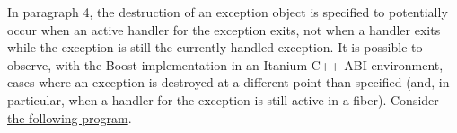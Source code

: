\newpage
{}\label{exlife}

In  paragraph 4, the destruction of an exception
object is specified to potentially occur when an active handler for the
exception exits, not when a handler exits while the exception is still the
currently handled exception. It is possible to observe, with the Boost
implementation in an Itanium C++ ABI environment, cases where an exception is
destroyed at a different point than specified (and, in particular, when a
handler for the exception is still active in a fiber). Consider
\href{https://github.com/secondlife/3p-boost/blob/nat/exstate/tests/early_exc_destroy.cpp}{the following program}.

